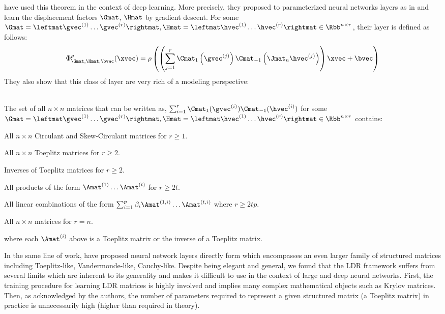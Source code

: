 \noindent
\citet{sindhwani2015structured} have used this theorem in the context of deep learning.
More precisely, they proposed to parameterized neural networks layers as in  and learn the displacement factors $\Gmat$, $\Hmat$ by gradient descent. 
For some $\Gmat = \leftmat \gvec^{(1)} \ldots \gvec^{(r)} \rightmat, \Hmat = \leftmat \hvec^{(1)} \ldots \hvec^{(r)} \rightmat \in \Rbb^{n \times r}$, their layer is defined as follows:
\begin{equation}
  \Phi^\rho_{\Gmat, \Hmat, \bvec}(\xvec) = \rho\left( \left(\sum_{j=1}^{r} \Cmat_1\left(\gvec^{(j)}\right) \Cmat_{-1}\left(\Jmat_n \hvec^{(j)}\right) \right) \xvec + \bvec \right)
\end{equation}
\noindent
They also show that this class of layer are very rich of a modeling perspective:
\begin{theorem} ~\\
  The set of all $n \times n$ matrices that can be written as, $\sum_{i=1}^{r} \Cmat_1(\gvec^{(i)}) \Cmat_{-1}(\hvec^{(i)})$
  for some $\Gmat = \leftmat \gvec^{(1)} \ldots \gvec^{(r)} \rightmat,
  \Hmat = \leftmat \hvec^{(1)} \ldots \hvec^{(r)} \rightmat \in \Rbb^{n \times r}$ contains:
  \begin{compactitem}
    \item All $n \times n$ Circulant and Skew-Circulant matrices for $r \geq 1$.
    \item All $n \times n$ Toeplitz matrices for $r \geq 2$.
    \item Inverses of Toeplitz matrices for $r \geq 2$.
    \item All products of the form $\Amat^{(1)} \ldots \Amat^{(t)}$ for $r \geq 2t$.
    \item All linear combinations of the form $\sum_{i=1}^p \beta_i \Amat^{(1, i)} \ldots \Amat^{(t, i)}$ where $r \geq 2tp$.
    \item All $n\times n$ matrices for $r=n$.
  \end{compactitem}
  where each $\Amat^{(i)}$ above is a Toeplitz matrix or the inverse of a Toeplitz matrix. 
\end{theorem}
\noindent
In the same line of work, \citet{thomas2018learning} have proposed neural network layers directly form  which encompasses an even larger family of structured matrices including Toeplitz-like, Vandermonde-like, Cauchy-like.
Despite being elegant and general, we found that the LDR framework suffers from several limits which are inherent to its generality and makes it difficult to use in the context of large and deep neural networks.
First, the training procedure for learning LDR matrices is highly involved and implies many complex mathematical objects such as Krylov matrices.
Then, as acknowledged by the authors, the number of parameters required to represent a given structured matrix (a Toeplitz matrix) in practice is unnecessarily high (higher than required in theory). 

